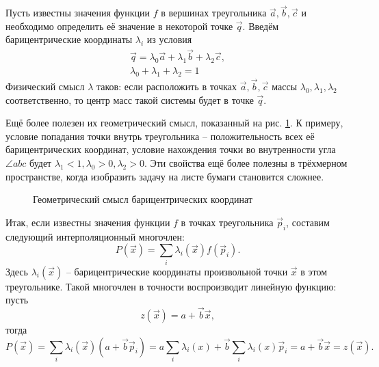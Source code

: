Пусть известны значения функции $f$ в вершинах треугольника $\vec{a}, \vec{b}, \vec{c}$ и необходимо определить её значение в некоторой точке $\vec{q}$. Введём барицентрические координаты $\lambda_i$ из условия 
\begin{eqnarray}
\vec{q} = \lambda_0 \vec{a} + \lambda_1 \vec{b} + \lambda_2 \vec{c}, \\
\lambda_0 + \lambda_1 + \lambda_2  = 1
\end{eqnarray}
Физический смысл $\lambda$ таков: если расположить в точках $\vec{a}, \vec{b}, \vec{c}$ массы $\lambda_0, \lambda_1, \lambda_2$ соответственно, то центр масс такой системы будет в точке $\vec{q}$. 

Ещё более полезен их геометрический смысл, показанный на рис. \ref{pic:barycentric}. К примеру, условие попадания точки внутрь треугольника -- положительность всех её барицентрических координат, условие нахождения точки во внутренности угла $\angle a b c$ будет $\lambda_1 < 1, \lambda_0 > 0, \lambda_2 > 0$. Эти свойства ещё более полезны в трёхмерном пространстве, когда изобразить задачу на листе бумаги становится сложнее.

\begin{figure}[H]
	\caption{Геометрический смысл барицентрических координат}
	\label{pic:barycentric}
\end{figure}

Итак, если известны значения функции $f$ в точках треугольника $\vec{p}_i$, составим следующий интерполяционный многочлен:
\begin{equation}
P(\vec{x}) = \sum_{i} \lambda_i(\vec{x}) f(\vec{p}_i).
\end{equation}
Здесь $\lambda_i(\vec{x})$ -- барицентрические координаты произвольной точки $\vec{x}$ в этом треугольнике. Такой многочлен в точности воспроизводит линейную функцию: пусть
\begin{equation}
z(\vec{x}) = a + \vec{b} \vec{x},
\end{equation}
тогда
\begin{equation}
P(\vec{x}) = \sum_{i} \lambda_i({\vec{x}}) (a + \vec{b} \vec{p}_i) = a \sum_{i} \lambda_i(x) + \vec{b} \sum_{i} \lambda_i(x) \vec{p}_i = a + \vec{b} \vec{x} = z(\vec{x}).
\end{equation}

